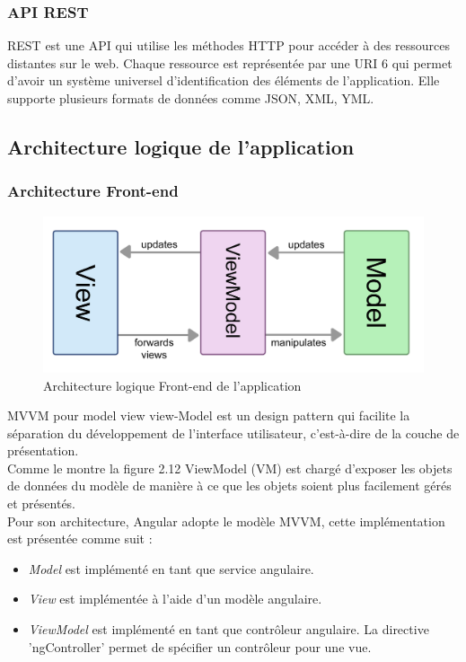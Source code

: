 \subsubsection{API REST}
REST est une API qui utilise les méthodes HTTP pour accéder à des ressources
distantes sur le web. Chaque ressource est représentée par une URI 6 qui permet d'avoir
un système universel d'identification des éléments de l'application. Elle supporte plusieurs
formats de données comme JSON, XML, YML.
\subsection {Architecture logique de l'application}

\subsubsection{Architecture Front-end}


	\begin{figure}[h]
	\centering
	\includegraphics[scale=0.1]{mvvm.jpg}
	\caption{Architecture logique Front-end de l'application}
	\label{Architecture logique Front-end de l'application}
\end{figure} 
MVVM pour model view view-Model est un design pattern qui facilite la séparation du développement de l'interface utilisateur, c'est-à-dire de la couche de présentation.\\Comme le montre la figure 2.12  ViewModel (VM) est chargé d'exposer les objets de données du modèle de manière à ce que les objets soient plus facilement gérés et présentés.\\
Pour son architecture, Angular adopte le modèle MVVM, cette implémentation est présentée comme suit : 
\begin{itemize}
	\item \textit{Model}  est implémenté en tant que service angulaire.
	\item \textit{View}  est implémentée à l'aide d'un modèle angulaire.
	\item \textit {ViewModel}  est implémenté en tant que contrôleur angulaire. La directive 'ngController' permet de spécifier un contrôleur pour une vue.
\end{itemize}
